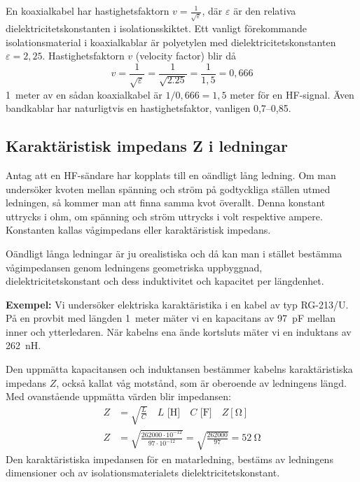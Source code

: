 En koaxialkabel har hastighetsfaktorn \(v = \frac{1}{\sqrt{\varepsilon}}\),
där \(\varepsilon\) är den relativa dielektricitetskonstanten i
isolationsskiktet.
Ett vanligt förekommande isolationsmaterial i koaxialkablar är polyetylen med
dielektricitetskonstanten \(\varepsilon = 2,25\).
Hastighetsfaktorn \(v\) (velocity factor) blir då
\[
v = \frac{1}{\sqrt{\varepsilon}} = \frac{1}{\sqrt{2.25}} = \frac{1}{1,5} = 0,666
\]
1~meter av en sådan koaxialkabel är \(1/0,666 = 1,5\) meter för en HF-signal.
Även bandkablar har naturligtvis en hastighetsfaktor, vanligen 0,7--0,85.


\subsection{Karaktäristisk impedans Z i led\-ningar}

Antag att en HF-sändare har kopplats till en oändligt lång ledning.
Om man undersöker kvoten mellan spänning och ström på godtyckliga ställen
utmed ledningen, så kommer man att finna samma kvot överallt.
Denna konstant uttrycks i ohm, om spänning och ström uttrycks i volt
respektive ampere.
Konstanten kallas vågimpedans eller karaktäristisk impedans.

Oändligt långa ledningar är ju orealistiska och då kan man i stället bestämma
vågimpedansen genom ledningens geometriska uppbyggnad, dielektricitetskonstant
och dess induktivitet och kapacitet per längdenhet.

\noindent\textbf{Exempel:}
Vi undersöker elektriska karaktäristika i en kabel av typ RG-213/U.
På en provbit med längden 1~meter mäter vi en kapacitans av \qty{97}{\pico\farad}
mellan inner och ytterledaren.
När kabelns ena ände kortsluts mäter vi en induktans av \qty{262}{\nano\henry}.

Den uppmätta kapacitansen och induktansen bestämmer kabelns karaktäristiska
impedans \(Z\), också kallat våg motstånd, som är oberoende av ledningens längd.
Med ovanstående uppmätta värden blir impedansen:
\begin{align*}
  Z &= \sqrt{\frac{L}{C}} \quad L\text{ [H]} \quad C\text{ [F]} \quad
  Z [\unit{\ohm}] \\
  Z &= \sqrt{\frac{262000\cdot 10^{-12}}{97\cdot 10^{-12}}} =
  \sqrt{\frac{262000}{97}} = \qty{52}{\ohm}
\end{align*}
Den karaktäristiska impedansen för en matarledning, bestäms av ledningens
dimensioner och av isolationsmaterialets dielektricitetskonstant.

